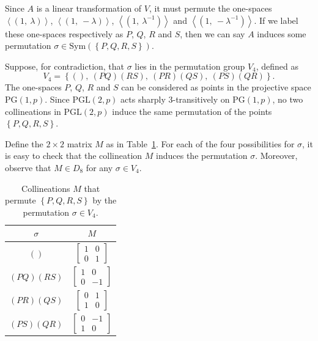 \documentclass[10pt]{amsart}
\theoremstyle{definition}
\theoremstyle{plain}
\theoremstyle{plain}
\theoremstyle{plain}
\theoremstyle{plain}
\newcommand{\PG}{\mathrm{PG}}
\newcommand{\PGL}{\mathrm{PGL}}
\newcommand{\Sym}{\mathrm{Sym}}
\begin{document}
Since $A$ is a linear transformation of $V$, it must permute the one-spaces $\left<\left(1,\ \lambda \right)\right>$, $\left<\left(1,\ -\lambda \right)\right>$, $\left<\left(1,\ \lambda^{-1} \right)\right>$ and $\left<\left(1,\ -\lambda^{-1} \right)\right>$. If we label these one-spaces respectively as $P$, $Q$, $R$ and $S$, then we can say $A$ induces some permutation $\sigma \in \Sym(\left\{P, Q, R, S \right\})$.

Suppose, for contradiction, that $\sigma$ lies in the permutation group $V_4$, defined as
\begin{displaymath}
V_4 = {\left\{(),\ {\left(PQ \right)}{\left(RS \right)},\ {\left(PR \right)}{\left(QS \right)},\ {\left(PS \right)}{\left(QR \right)} \right\}}.
\end{displaymath}
The one-spaces $P$, $Q$, $R$ and $S$ can be considered as points in the projective space $\PG{\left(1, p \right)}$. Since $\PGL{\left(2, p \right)}$ acts sharply $3$-transitively on $\PG{\left(1, p \right)}$, no two collineations in $\PGL{\left(2, p \right)}$ induce the same permutation of the points $\left\{P, Q, R, S \right\}$.

Define the $2 \times 2$ matrix $M$ as in Table~\ref{tbl:V_4-collineations}. For each of the four possibilities for $\sigma$, it is easy to check that the collineation $M$ induces the permutation $\sigma$. Moreover, observe that $M \in D_8$ for any $\sigma \in V_4$.

\begin{table}
\centering
\begin{tabular}{cc}
\hline
$\sigma$ & $M$ \\
\hline
\vphantom{\Bigg(}$()$ & $\begin{bmatrix} 1 & 0 \\ 0 & 1 \end{bmatrix}$ \\
\vphantom{\Bigg(}${\left(PQ \right)}{\left(RS \right)}$ & $\begin{bmatrix} 1 & 0 \\ 0 & -1 \end{bmatrix}$ \\
\vphantom{\Bigg(}${\left(PR \right)}{\left(QS \right)}$ & $\begin{bmatrix} 0 & 1 \\ 1 & 0 \end{bmatrix}$ \\
\vphantom{\Bigg(}${\left(PS \right)}{\left(QR \right)}$ & $\begin{bmatrix} 0 & -1 \\ 1 & 0 \end{bmatrix}$ \\
\hline
\end{tabular}
\caption{Collineations $M$ that permute $\left\{P, Q, R, S \right\}$ by the permutation $\sigma \in V_4$.}
\label{tbl:V_4-collineations}
\end{table}
\end{document}
